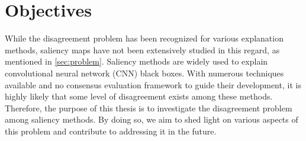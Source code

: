 \section{Objectives}
\label{sec:objective}
While the disagreement problem has been recognized for various explanation methods, saliency maps have not been extensively studied in this regard, as mentioned in \ref{sec:problem}. Saliency methods are widely used to explain convolutional neural network (CNN) black boxes. With numerous techniques available and no consensus evaluation framework to guide their development, it is highly likely that some level of disagreement exists among these methods. Therefore, the purpose of this thesis is to investigate the disagreement problem among saliency methods. By doing so, we aim to shed light on various aspects of this problem and contribute to addressing it in the future.



